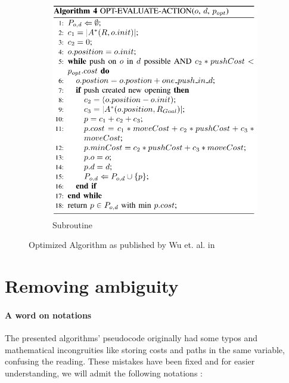 \begin{figure}[H]
\begin{subfigure}{.5\textwidth}
  \includegraphics[width=\linewidth]{Figures/Wu_Original_Algorithm/algo4.png}
  \caption{Subroutine}
  \label{fig:Wu_Original_Algorithm-algo4}
\end{subfigure}
\caption{Optimized Algorithm as published by Wu et. al. in \parencite{wu_navigation_2010}}
\label{fig:Wu_Original_Algorithm-optimized}
\end{figure}

\section{Removing ambiguity}

\paragraph{A word on notations} The presented algorithms' pseudocode originally had some typos and mathematical incongruities like storing costs and paths in the same variable, confusing the reading. These mistakes have been fixed and for easier understanding, we will admit the following notations :

